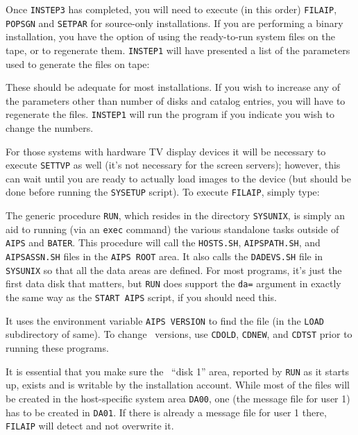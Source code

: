 \medskip{}

Once {\tt INSTEP3} has completed, you will need to execute (in this
order) {\tt FILAIP}, {\tt POPSGN} and {\tt SETPAR} for source-only
installations.  If you are performing a binary installation, you have the
option of using the ready-to-run system files on the tape, or to
regenerate them.  {\tt INSTEP1} will have presented a list of the
parameters used to generate the files on tape:\medskip

\medskip

\noindent These should be adequate for most installations.  If you wish to
increase any of the parameters other than number of disks and catalog
entries, you will have to regenerate the files.  {\tt INSTEP1} will run
the program if you indicate you wish to change the numbers.

For those systems with hardware TV display devices it will be necessary to
execute {\tt SETTVP} as well (it's not necessary for the screen servers);
however, this can wait until you are ready to actually load images to the
device (but should be done before running the {\tt SYSETUP} script).  To
execute {\tt FILAIP}, simply type:\medskip


\medskip\noindent
The generic procedure {\tt RUN}, which resides in the directory
{\tt\dol SYSUNIX}, is simply an aid to running (via an {\tt exec} command)
the various standalone tasks outside of {\tt AIPS} and {\tt BATER}.
This procedure will call the {\tt HOSTS.SH}, {\tt AIPSPATH.SH}, and {\tt
AIPSASSN.SH} files in the {\tt \dol AIPS ROOT} area.  It also calls the
{\tt DADEVS.SH} file in {\tt \dol SYSUNIX} so that all the data areas are
defined.  For most programs, it's just the first data disk that matters,
but {\tt RUN} does support the {\tt da=} argument in exactly the same
way as the {\tt START AIPS} script, if you should need this.

It uses the environment variable {\tt\dol AIPS VERSION} to find the file
(in the {\tt LOAD} subdirectory of same).  To change \AIPS\ versions,
use {\tt\dol CDOLD}, {\tt\dol CDNEW}, and {\tt\dol CDTST} prior to running these
programs.

It is essential that you make sure the \AIPS\ ``disk 1'' area, reported
by {\tt RUN} as it starts up, exists and is writable by the installation
account.  While most of the files will be created in the host-specific
system area {\tt\dol DA00}, one (the message file for user 1) has to be
created in {\tt\dol DA01}.  If there is already a message file for user 1
there, {\tt FILAIP} will detect and not overwrite it.

